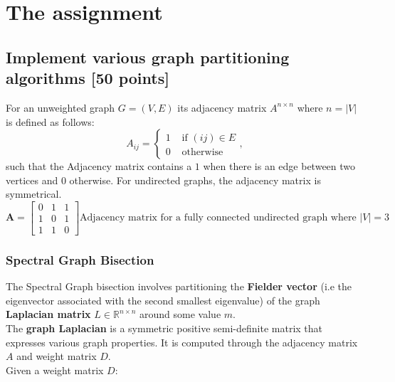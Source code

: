 \documentclass[unicode,11pt,a4paper,oneside,numbers=endperiod,openany]{scrartcl}
\begin{document}
\setassignment
{}

\newline

\assignmentpolicy

\tableofcontents

\clearpage
\section{The assignment}

\subsection{Implement various graph partitioning algorithms [50 points]}
For an unweighted graph $G = (V, E)$ its adjacency matrix $A^{n\times n}$ where $n = |V|$ is defined as follows:
\[
A_{i j}=\left\{\begin{array}{ll}
1 & \text { if }(i j) \in E \\
0 & \text { otherwise }
\end{array},\right.
\]
such that the Adjacency matrix contains a $1$ when there is an edge between two vertices and $0$ otherwise. For undirected graphs, the adjacency matrix is symmetrical.\\
\[
\mathbf{A} =\left[\begin{array}{ccc}
0 & 1 & 1 \\
1 & 0 & 1 \\
1 & 1 & 0
\end{array}\right] \text{Adjacency matrix for a fully connected undirected graph where  } |V|=3
\]

\subsubsection*{Spectral Graph Bisection}
The Spectral Graph bisection involves partitioning the \textbf{Fielder vector} (i.e the eigenvector associated with the second smallest eigenvalue) of the graph \textbf{Laplacian matrix} $L\in  \mathbb{R}^{n\times n}$ around some value $m$.\\
The \textbf{graph Laplacian} is a symmetric positive semi-definite matrix that expresses various graph properties. It is computed through the adjacency matrix $A$ and weight matrix $D$.\\
Given a weight matrix $D$:
\end{document}
